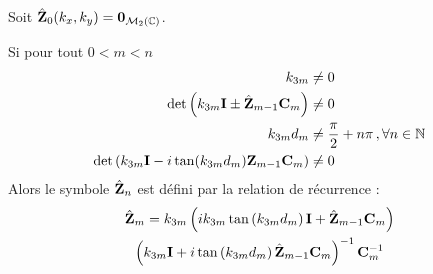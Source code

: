         \begin{thm}
            Soit \(\hat {\mathbf{Z}}_0(k_x,k_y) = \mathbf{0}_{\mathcal{M}_2(\mathbb C)}\).

            Si pour tout \(0<m < n\)
            \begin{align}
                k_{3m} &\not = 0 \\
                \det\left(k_{3m}\mathbf{I} \pm \hat {\mathbf{Z}}_{m-1}\mathbf{C}_m \right) &\not = 0 \\
                k_{3m}d_m &\not = \dfrac{\pi}{2}+n\pi\,, \forall n \in \mathbb N \\
                \det\left(k_{3m}\mathbf{I} - i\tan(k_{3m}d_m)\mathbf{Z}_{m-1}\mathbf{C}_m\right) &\not = 0
            \end{align}
            Alors le symbole \(\hat {\mathbf{Z}}_n\) est défini par la relation de récurrence :
            \begin{multline}
                \hat {\mathbf{Z}}_m = k_{3m}
                \left(ik_{3m}\tan\left(k_{3m}d_m\right)\mathbf{I} + \hat {\mathbf{Z}}_{m-1}\mathbf{C}_m\right) \\
                \left(k_{3m}\mathbf{I} + i\tan\left(k_{3m}d_m\right)\hat {\mathbf{Z}}_{m-1}\mathbf{C}_m\right)^{-1}
                \mathbf{C}_m^{-1}
            \end{multline}
        \end{thm}

